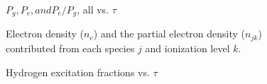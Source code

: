 \documentclass[preprint]{aastex}
\begin{document}
\begin{figure}[htb!]  %
    \caption{$P_{g}, P_{e}, and P_{e}/P_{g}$, all vs. $\tau$}
\end{figure}

\begin{figure}[htb!]  %
    \caption{Electron density ($n_{e}$) and the partial electron density
        ($n_{jk}$) contributed from each species $j$ and ionization level $k$.}
\end{figure}

\begin{figure}[htb!]  %
    \caption{Hydrogen excitation fractions vs. $\tau$}
\end{figure}


\end{document}
